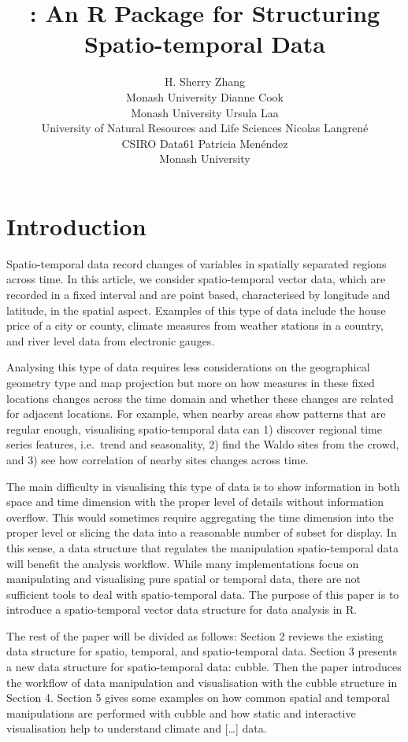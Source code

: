 \documentclass[
]{jss}
\author{
H. Sherry Zhang\\Monash University \And Dianne Cook\\Monash University
\AND Ursula Laa\\University of Natural Resources and Life Sciences
\AND Nicolas Langrené\\CSIRO Data61 \AND Patricia
Menéndez\\Monash University \AND
}
\title{\pkg{cubble}: An R Package for Structuring Spatio-temporal Data}
\begin{document}
\newpage

\hypertarget{introduction}{%
\section{Introduction}\label{introduction}}

Spatio-temporal data record changes of variables in spatially separated
regions across time. In this article, we consider spatio-temporal vector
data, which are recorded in a fixed interval and are point based,
characterised by longitude and latitude, in the spatial aspect. Examples
of this type of data include the house price of a city or county,
climate measures from weather stations in a country, and river level
data from electronic gauges.

Analysing this type of data requires less considerations on the
geographical geometry type and map projection but more on how measures
in these fixed locations changes across the time domain and whether
these changes are related for adjacent locations. For example, when
nearby areas show patterns that are regular enough, visualising
spatio-temporal data can 1) discover regional time series features,
i.e.~trend and seasonality, 2) find the Waldo sites from the crowd, and
3) see how correlation of nearby sites changes across time.

The main difficulty in visualising this type of data is to show
information in both space and time dimension with the proper level of
details without information overflow. This would sometimes require
aggregating the time dimension into the proper level or slicing the data
into a reasonable number of subset for display. In this sense, a data
structure that regulates the manipulation spatio-temporal data will
benefit the analysis workflow. While many implementations focus on
manipulating and visualising pure spatial or temporal data, there are
not sufficient tools to deal with spatio-temporal data. The purpose of
this paper is to introduce a spatio-temporal vector data structure for
data analysis in R.

The rest of the paper will be divided as follows: Section 2 reviews the
existing data structure for spatio, temporal, and spatio-temporal data.
Section 3 presents a new data structure for spatio-temporal data:
cubble. Then the paper introduces the workflow of data manipulation and
visualisation with the cubble structure in Section 4. Section 5 gives
some examples on how common spatial and temporal manipulations are
performed with cubble and how static and interactive visualisation help
to understand climate and {[}\ldots{]} data.
\end{document}
